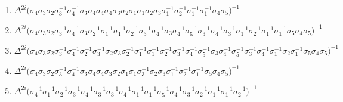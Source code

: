 \begin{enumerate}
    \item $\displaystyle \Delta^{2i} \big( \allowbreak\sigma_{4}\allowbreak\sigma_{3}\allowbreak\sigma_{2}\allowbreak\sigma_{3}^{-1}\allowbreak\sigma_{4}^{-1}\allowbreak\sigma_{3}\allowbreak\sigma_{4}\allowbreak\sigma_{4}\allowbreak\sigma_{4}\allowbreak\sigma_{3}\allowbreak\sigma_{2}\allowbreak\sigma_{1}\allowbreak\sigma_{1}\allowbreak\sigma_{2}\allowbreak\sigma_{3}\allowbreak\sigma_{1}^{-1}\allowbreak\sigma_{2}^{-1}\allowbreak\sigma_{1}^{-1}\allowbreak\sigma_{1}^{-1}\allowbreak\sigma_{4}\allowbreak\sigma_{5} \big)^{-1}$
    \item $\displaystyle \Delta^{2i} \big( \allowbreak\sigma_{4}\allowbreak\sigma_{3}\allowbreak\sigma_{2}\allowbreak\sigma_{3}^{-1}\allowbreak\sigma_{4}^{-1}\allowbreak\sigma_{3}\allowbreak\sigma_{2}^{-1}\allowbreak\sigma_{1}^{-1}\allowbreak\sigma_{1}^{-1}\allowbreak\sigma_{2}^{-1}\allowbreak\sigma_{3}^{-1}\allowbreak\sigma_{4}^{-1}\allowbreak\sigma_{3}\allowbreak\sigma_{4}^{-1}\allowbreak\sigma_{5}^{-1}\allowbreak\sigma_{3}^{-1}\allowbreak\sigma_{4}^{-1}\allowbreak\sigma_{3}^{-1}\allowbreak\sigma_{1}^{-1}\allowbreak\sigma_{2}^{-1}\allowbreak\sigma_{1}^{-1}\allowbreak\sigma_{1}^{-1}\allowbreak\sigma_{5}\allowbreak\sigma_{4}\allowbreak\sigma_{5} \big)^{-1}$
    \item $\displaystyle \Delta^{2i} \big( \allowbreak\sigma_{4}\allowbreak\sigma_{3}\allowbreak\sigma_{2}\allowbreak\sigma_{3}^{-1}\allowbreak\sigma_{4}^{-1}\allowbreak\sigma_{2}^{-1}\allowbreak\sigma_{3}^{-1}\allowbreak\sigma_{2}\allowbreak\sigma_{3}\allowbreak\sigma_{2}^{-1}\allowbreak\sigma_{1}^{-1}\allowbreak\sigma_{1}^{-1}\allowbreak\sigma_{2}^{-1}\allowbreak\sigma_{3}^{-1}\allowbreak\sigma_{4}^{-1}\allowbreak\sigma_{5}^{-1}\allowbreak\sigma_{3}\allowbreak\sigma_{4}^{-1}\allowbreak\sigma_{5}^{-1}\allowbreak\sigma_{3}^{-1}\allowbreak\sigma_{4}^{-1}\allowbreak\sigma_{1}^{-1}\allowbreak\sigma_{2}\allowbreak\sigma_{1}^{-1}\allowbreak\sigma_{5}\allowbreak\sigma_{4}\allowbreak\sigma_{5} \big)^{-1}$
    \item $\displaystyle \Delta^{2i} \big( \allowbreak\sigma_{4}\allowbreak\sigma_{3}\allowbreak\sigma_{2}\allowbreak\sigma_{3}^{-1}\allowbreak\sigma_{4}^{-1}\allowbreak\sigma_{3}\allowbreak\sigma_{4}\allowbreak\sigma_{4}\allowbreak\sigma_{3}\allowbreak\sigma_{2}\allowbreak\sigma_{1}\allowbreak\sigma_{1}\allowbreak\sigma_{3}^{-1}\allowbreak\sigma_{2}\allowbreak\sigma_{3}\allowbreak\sigma_{1}^{-1}\allowbreak\sigma_{2}^{-1}\allowbreak\sigma_{1}^{-1}\allowbreak\sigma_{5}\allowbreak\sigma_{4}\allowbreak\sigma_{5} \big)^{-1}$
    \item $\displaystyle \Delta^{2i} \big( \allowbreak\sigma_{4}^{-1}\allowbreak\sigma_{1}^{-1}\allowbreak\sigma_{2}^{-1}\allowbreak\sigma_{3}^{-1}\allowbreak\sigma_{4}^{-1}\allowbreak\sigma_{3}^{-1}\allowbreak\sigma_{3}^{-1}\allowbreak\sigma_{4}^{-1}\allowbreak\sigma_{1}^{-1}\allowbreak\sigma_{1}^{-1}\allowbreak\sigma_{5}^{-1}\allowbreak\sigma_{4}^{-1}\allowbreak\sigma_{3}^{-1}\allowbreak\sigma_{2}^{-1}\allowbreak\sigma_{1}^{-1}\allowbreak\sigma_{1}^{-1}\allowbreak\sigma_{2}^{-1} \big)^{-1}$

\end{enumerate}
